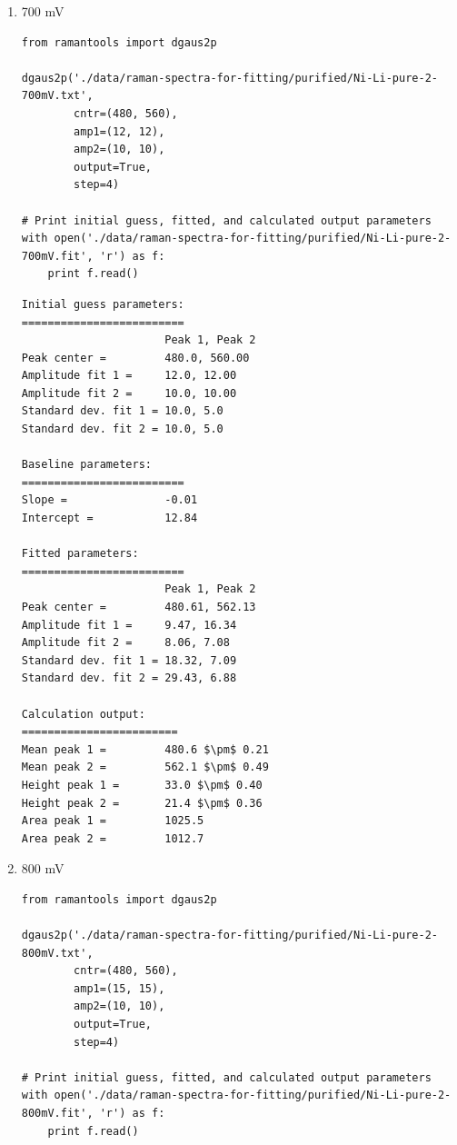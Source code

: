 \documentclass[journal=jpccck,manuscript=suppinfo,email=true]{achemso}
\begin{document}
\begin{enumerate}
\begin{enumerate}
\begin{enumerate}
\item 700 mV
\label{sec-4-1-0-1-2-2}
\begin{verbatim}
from ramantools import dgaus2p

dgaus2p('./data/raman-spectra-for-fitting/purified/Ni-Li-pure-2-700mV.txt',
        cntr=(480, 560),
        amp1=(12, 12),
        amp2=(10, 10),
        output=True,
        step=4)

# Print initial guess, fitted, and calculated output parameters
with open('./data/raman-spectra-for-fitting/purified/Ni-Li-pure-2-700mV.fit', 'r') as f:
    print f.read()
\end{verbatim}

\begin{verbatim}
Initial guess parameters:
=========================
                      Peak 1, Peak 2
Peak center =         480.0, 560.00
Amplitude fit 1 =     12.0, 12.00
Amplitude fit 2 =     10.0, 10.00
Standard dev. fit 1 = 10.0, 5.0
Standard dev. fit 2 = 10.0, 5.0

Baseline parameters:
=========================
Slope =               -0.01
Intercept =           12.84

Fitted parameters:
=========================
                      Peak 1, Peak 2
Peak center =         480.61, 562.13
Amplitude fit 1 =     9.47, 16.34
Amplitude fit 2 =     8.06, 7.08
Standard dev. fit 1 = 18.32, 7.09
Standard dev. fit 2 = 29.43, 6.88

Calculation output:
========================
Mean peak 1 =         480.6 $\pm$ 0.21
Mean peak 2 =         562.1 $\pm$ 0.49
Height peak 1 =       33.0 $\pm$ 0.40
Height peak 2 =       21.4 $\pm$ 0.36
Area peak 1 =         1025.5
Area peak 2 =         1012.7
\end{verbatim}

\item 800 mV
\label{sec-4-1-0-1-2-3}
\begin{verbatim}
from ramantools import dgaus2p

dgaus2p('./data/raman-spectra-for-fitting/purified/Ni-Li-pure-2-800mV.txt',
        cntr=(480, 560),
        amp1=(15, 15),
        amp2=(10, 10),
        output=True,
        step=4)

# Print initial guess, fitted, and calculated output parameters
with open('./data/raman-spectra-for-fitting/purified/Ni-Li-pure-2-800mV.fit', 'r') as f:
    print f.read()
\end{verbatim}


\end{enumerate}
\end{enumerate}
\end{enumerate}
\end{document}

